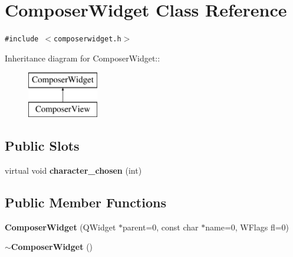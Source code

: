 \section{Composer\-Widget Class Reference}
\label{classComposerWidget}
{\tt \#include $<$composerwidget.h$>$}

Inheritance diagram for Composer\-Widget::\begin{figure}[H]
\begin{center}
\leavevmode
\includegraphics[height=2cm]{classComposerWidget}
\end{center}
\end{figure}
\subsection*{Public Slots}
\begin{CompactItemize}
\item 
virtual void {\bf character\_\-chosen} (int)
\end{CompactItemize}
\subsection*{Public Member Functions}
\begin{CompactItemize}
\item 
{\bf Composer\-Widget} (QWidget $\ast$parent=0, const char $\ast$name=0, WFlags fl=0)
\item 
{\bf $\sim$Composer\-Widget} ()
\end{CompactItemize}
